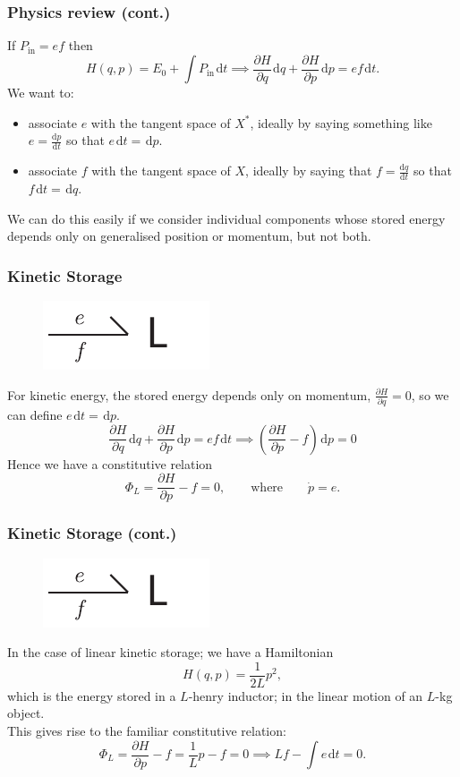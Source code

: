 \documentclass[11pt,reqno]{beamer}
\newcommand{\D}[2]{\frac{\mathrm{d} #1}{\mathrm{d} #2}}
\renewcommand{\P}[2]{\frac{\partial #1}{\partial #2}}
\newcommand{\df}[1]{\mspace{2mu}  \mathrm{d}#1}
\begin{document}
\begin{frame}
\frametitle{Physics review (cont.)}
If $P_\text{in} = ef$ then
\[
H(q, p) = E_0 + \int P_\text{in}\df{t} \implies \P{H}{q} \df{q} + \P{H}{p}\df{p} = ef\df{t}.
\]
We want to:
\begin{itemize}
	\item associate $e$ with the tangent space of $X^*$, ideally by saying something like $e = \D{p}{t}$ so that $e\df{t} =\df{p}$.
	\item associate $f$ with the tangent space of $X$, ideally by saying that $f = \D{q}{t}$ so that $f\df{t} = \df{q}$.
\end{itemize}
We can do this easily if we consider individual components whose stored energy depends only on generalised position or momentum, but not both.
\end{frame}
\begin{frame}
\frametitle{Kinetic Storage}
\begin{figure}
	\includegraphics{images/oneport-L.pdf}
\end{figure}
For kinetic energy, the stored energy depends only on momentum, $\P{H}{q} = 0$, so we can define $e\df{t} = \df{p}$.
\[
\P{H}{q} \df{q} + \P{H}{p}\df{p} = ef\df{t} \implies  \left(\P{H}{p} - f\right)\df{p}= 0
\]
Hence we have a constitutive relation
\[
\Phi_L = \P{H}{p} - f= 0, \qquad  \text{where}\qquad \dot{p} = e.
\]
\end{frame}
\begin{frame}
\frametitle{Kinetic Storage (cont.)}
\begin{figure}
	\includegraphics{images/oneport-L.pdf}
\end{figure}
In the case of linear kinetic storage; we have a Hamiltonian
\[
H(q,p) = \frac{1}{2L}p^2,
\]
which is the energy stored in a $L$-henry inductor; in the linear motion of an $L$-kg object.\\

\vspace{10pt}
This gives rise to the familiar constitutive relation:
\[
\Phi_L = \P{H}{p} - f = \frac{1}{L}p - f =0 \implies Lf -  \int e \df{t} = 0.
\]
\end{frame}
\end{document}
